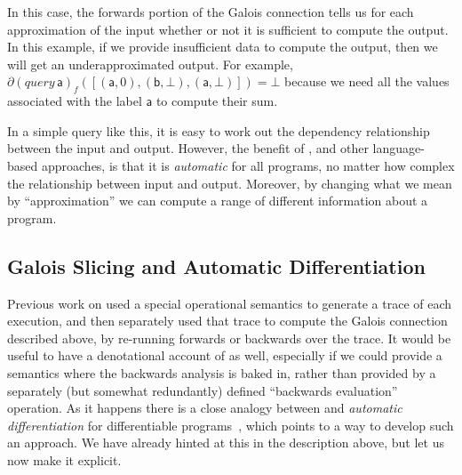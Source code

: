 \begin{example}
  In this case, the forwards portion of the Galois connection tells us for each approximation of the input whether or not it is sufficient to compute the output. In this example, if we provide insufficient data to compute the output, then we will get an underapproximated output. For example, $\partial (\mathit{query}\, \mathsf{a})_f([(\mathsf{a},0),(\mathsf{b},\bot),(\mathsf{a},\bot)]) = \bot$ because we need all the values associated with the label $\mathsf{a}$ to compute their sum.

  In a simple query like this, it is easy to work out the dependency relationship between the input and output. However, the benefit of \GPS, and other language-based approaches, is that it is {\em automatic} for all programs, no matter how complex the relationship between input and output. Moreover, by changing what we mean by ``approximation'' we can compute a range of different information about a program.
\end{example}

\subsection{Galois Slicing and Automatic Differentiation}

Previous work on \GPS used a special operational semantics to generate a trace of each execution, and then separately used that trace to compute the Galois connection described above, by re-running forwards or backwards over the trace. It would be useful to have a denotational account of \GPS as well, especially if we could provide a semantics where the backwards analysis is baked in, rather than provided by a separately (but somewhat redundantly) defined ``backwards evaluation'' operation. As it happens there is a close analogy between \GPS and \emph{automatic differentiation} for differentiable programs~\cite{siskind08,elliott18,vákár22}, which points to a way to develop such an approach. We have already hinted at this in the description above, but let us now make it explicit.

